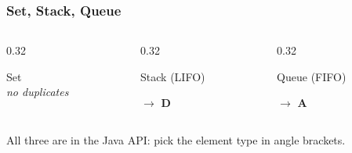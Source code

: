 \documentclass[aspectratio=169,10pt, compress]{beamer}
\begin{document}
\begin{frame}[t,fragile] \frametitle{Set, Stack, Queue}
  \begin{columns}[T]
    \begin{column}{0.32\textwidth}
      \begin{block}{Set}
        \centering\small
        \\[0.3em]
        \emph{no duplicates}
      \end{block}
      \small {}
    \end{column}
    \begin{column}{0.32\textwidth}
      \begin{block}{Stack (LIFO)}
        \begin{center}
        \end{center}
        \small {} $\to$ \textbf{D}
      \end{block}
      \small {}
    \end{column}
    \begin{column}{0.32\textwidth}
      \begin{block}{Queue (FIFO)}
        \begin{center}
        \end{center}
        \small {} $\to$ \textbf{A}
      \end{block}
      \small {}
    \end{column}
  \end{columns}
  \vspace{0.5em}
  \small All three are  in the Java API: pick the element type in angle brackets.
\end{frame}
\end{document}
